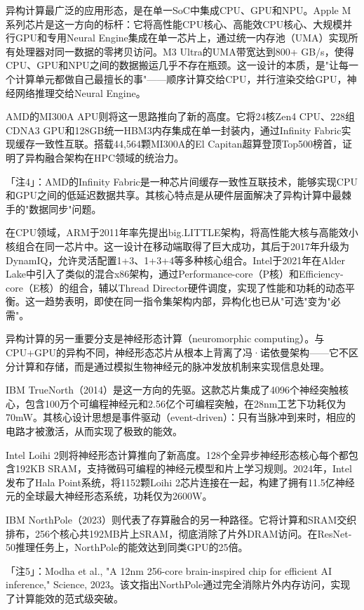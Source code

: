 \documentclass[11pt,a4paper]{article}
\begin{document}
异构计算最广泛的应用形态，是在单一SoC中集成CPU、GPU和NPU。Apple M系列芯片是这一方向的标杆：它将高性能CPU核心、高能效CPU核心、大规模并行GPU和专用Neural Engine集成在单一芯片上，通过统一内存池（UMA）实现所有处理器对同一数据的零拷贝访问。M3 Ultra的UMA带宽达到800+ GB/s，使得CPU、GPU和NPU之间的数据搬运几乎不存在瓶颈。这一设计的本质，是"让每一个计算单元都做自己最擅长的事"——顺序计算交给CPU，并行渲染交给GPU，神经网络推理交给Neural Engine。

AMD的MI300A APU则将这一思路推向了新的高度。它将24核Zen4 CPU、228组CDNA3 GPU和128GB统一HBM3内存集成在单一封装内，通过Infinity Fabric实现缓存一致性互联。搭载44,564颗MI300A的El Capitan超算登顶Top500榜首，证明了异构融合架构在HPC领域的统治力。

「注4」：AMD的Infinity Fabric是一种芯片间缓存一致性互联技术，能够实现CPU和GPU之间的低延迟数据共享。其核心特点是从硬件层面解决了异构计算中最棘手的"数据同步"问题。

在CPU领域，ARM于2011年率先提出big.LITTLE架构，将高性能大核与高能效小核组合在同一芯片中。这一设计在移动端取得了巨大成功，其后于2017年升级为DynamIQ，允许灵活配置1+3、1+3+4等多种核心组合。Intel于2021年在Alder Lake中引入了类似的混合x86架构，通过Performance-core（P核）和Efficiency-core（E核）的组合，辅以Thread Director硬件调度，实现了性能和功耗的动态平衡。这一趋势表明，即使在同一指令集架构内部，异构化也已从"可选"变为"必需"。

异构计算的另一重要分支是神经形态计算（neuromorphic computing）。与CPU+GPU的异构不同，神经形态芯片从根本上背离了冯·诺依曼架构——它不区分计算和存储，而是通过模拟生物神经元的脉冲发放机制来实现信息处理。

IBM TrueNorth（2014）是这一方向的先驱。这款芯片集成了4096个神经突触核心，包含100万个可编程神经元和2.56亿个可编程突触，在28nm工艺下功耗仅为70mW。其核心设计思想是事件驱动（event-driven）：只有当脉冲到来时，相应的电路才被激活，从而实现了极致的能效。

Intel Loihi 2则将神经形态计算推向了新高度。128个全异步神经形态核心每个都包含192KB SRAM，支持微码可编程的神经元模型和片上学习规则。2024年，Intel发布了Hala Point系统，将1152颗Loihi 2芯片连接在一起，构建了拥有11.5亿神经元的全球最大神经形态系统，功耗仅为2600W。

IBM NorthPole（2023）则代表了存算融合的另一种路径。它将计算和SRAM交织排布，256个核心共192MB片上SRAM，彻底消除了片外DRAM访问。在ResNet-50推理任务上，NorthPole的能效达到同类GPU的25倍。

「注5」：Modha et al., "A 12nm 256-core brain-inspired chip for efficient AI inference," Science, 2023。该文指出NorthPole通过完全消除片外内存访问，实现了计算能效的范式级突破。
\end{document}
